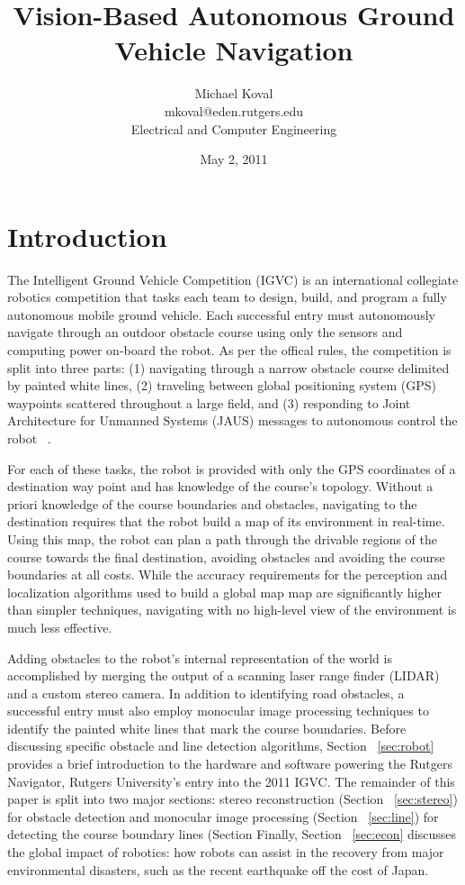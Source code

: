\documentclass[twocolumn,11pt]{article}
\title{Vision-Based Autonomous Ground Vehicle Navigation}
\date{May 2, 2011}
\author{
	Michael Koval \\
	mkoval@eden.rutgers.edu \\
	Electrical and Computer Engineering
}
\begin{document}
\maketitle

\section{Introduction}
\label{sec:intro}
The Intelligent Ground Vehicle Competition (IGVC) is an international
collegiate robotics competition that tasks each team to design,
build, and program a fully autonomous mobile ground vehicle.  Each successful
entry must autonomously navigate through an outdoor obstacle course using only
the sensors and computing power on-board the robot. As per the offical rules,
the competition is split into three parts: (1) navigating through a narrow
obstacle course delimited by painted white lines, (2) traveling between global
positioning system (GPS) waypoints scattered throughout a large field, and
(3) responding to Joint Architecture for Unmanned Systems (JAUS) messages to
autonomous control the robot ~\cite{igvc11}.

For each of these tasks, the robot is provided with only the GPS coordinates of
a destination way point and has knowledge of the course's topology. Without a
priori knowledge of the course boundaries and obstacles, navigating to the
destination requires that the robot build a map of its environment in
real-time. Using this map, the robot can plan a path through the drivable
regions of the course towards the final destination, avoiding obstacles and
avoiding the course boundaries at all costs. While the accuracy requirements
for the  perception and localization algorithms used to build a global map map
are significantly higher than simpler techniques, navigating with no high-level
view of the environment is much less effective.

Adding obstacles to the robot's internal representation of the world is
accomplished by merging the output of a scanning laser range finder (LIDAR) and
a custom stereo camera. In addition to identifying road obstacles, a successful
entry must also employ monocular image processing techniques to identify the
painted white lines that mark the course boundaries. Before discussing specific
obstacle and line detection algorithms, Section ~\ref{sec:robot} provides a
brief introduction to the hardware and software powering the Rutgers Navigator,
Rutgers University's entry into the 2011 IGVC.  The remainder of this paper is
split into two major sections: stereo reconstruction (Section
~\ref{sec:stereo}) for obstacle detection and monocular image processing
(Section ~\ref{sec:line}) for detecting the course boundary lines (Section
Finally, Section ~\ref{sec:econ} discusses the global impact of robotics: how
robots can assist in the recovery from major environmental disasters, such as
the recent earthquake off the cost of Japan.
\end{document}
